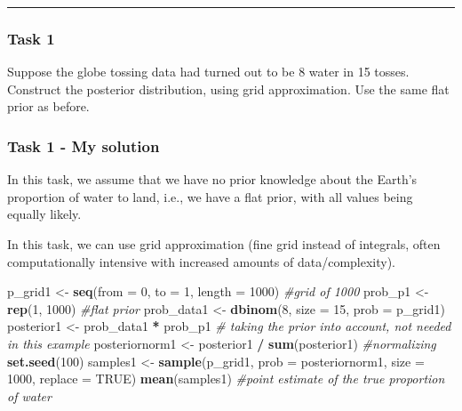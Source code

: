 \documentclass[]{article}
\newenvironment{Shaded}{\begin{snugshade}}{\end{snugshade}}
\newcommand{\CommentTok}[1]{\textcolor[rgb]{0.56,0.35,0.01}{\textit{#1}}}
\newcommand{\DataTypeTok}[1]{\textcolor[rgb]{0.13,0.29,0.53}{#1}}
\newcommand{\DecValTok}[1]{\textcolor[rgb]{0.00,0.00,0.81}{#1}}
\newcommand{\KeywordTok}[1]{\textcolor[rgb]{0.13,0.29,0.53}{\textbf{#1}}}
\newcommand{\NormalTok}[1]{#1}
\newcommand{\OperatorTok}[1]{\textcolor[rgb]{0.81,0.36,0.00}{\textbf{#1}}}
\newcommand{\OtherTok}[1]{\textcolor[rgb]{0.56,0.35,0.01}{#1}}
\newcommand{\StringTok}[1]{\textcolor[rgb]{0.31,0.60,0.02}{#1}}
\begin{document}
\begin{center}\rule{0.5\linewidth}{\linethickness}\end{center}

\hypertarget{task-1}{%
\subsubsection{Task 1}\label{task-1}}

Suppose the globe tossing data had turned out to be 8 water in 15
tosses. Construct the posterior distribution, using grid approximation.
Use the same flat prior as before.

\hypertarget{task-1---my-solution}{%
\subsubsection{Task 1 - My solution}\label{task-1---my-solution}}

In this task, we assume that we have no prior knowledge about the
Earth's proportion of water to land, i.e., we have a flat prior, with
all values being equally likely.

In this task, we can use grid approximation (fine grid instead of
integrals, often computationally intensive with increased amounts of
data/complexity).

\begin{Shaded}
\begin{Highlighting}[]
\NormalTok{p_grid1 <-}\StringTok{ }\KeywordTok{seq}\NormalTok{(}\DataTypeTok{from =} \DecValTok{0}\NormalTok{, }\DataTypeTok{to =} \DecValTok{1}\NormalTok{, }\DataTypeTok{length =} \DecValTok{1000}\NormalTok{) }\CommentTok{#grid of 1000}
\NormalTok{prob_p1 <-}\StringTok{ }\KeywordTok{rep}\NormalTok{(}\DecValTok{1}\NormalTok{, }\DecValTok{1000}\NormalTok{) }\CommentTok{#flat prior}
\NormalTok{prob_data1 <-}\StringTok{ }\KeywordTok{dbinom}\NormalTok{(}\DecValTok{8}\NormalTok{, }\DataTypeTok{size =} \DecValTok{15}\NormalTok{, }\DataTypeTok{prob =}\NormalTok{ p_grid1)}
\NormalTok{posterior1 <-}\StringTok{ }\NormalTok{prob_data1 }\OperatorTok{*}\StringTok{ }\NormalTok{prob_p1 }\CommentTok{# taking the prior into account, not needed in this example}
\NormalTok{posteriornorm1 <-}\StringTok{ }\NormalTok{posterior1 }\OperatorTok{/}\StringTok{ }\KeywordTok{sum}\NormalTok{(posterior1) }\CommentTok{#normalizing}
\KeywordTok{set.seed}\NormalTok{(}\DecValTok{100}\NormalTok{)}
\NormalTok{samples1 <-}\StringTok{ }\KeywordTok{sample}\NormalTok{(p_grid1, }\DataTypeTok{prob =}\NormalTok{ posteriornorm1, }\DataTypeTok{size =} \DecValTok{1000}\NormalTok{, }\DataTypeTok{replace =} \OtherTok{TRUE}\NormalTok{)}
\KeywordTok{mean}\NormalTok{(samples1) }\CommentTok{#point estimate of the true proportion of water}
\end{Highlighting}
\end{Shaded}
\end{document}
